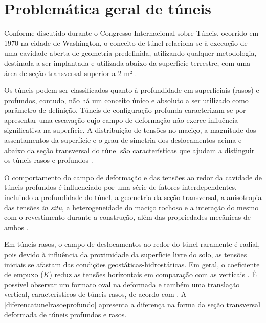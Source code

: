 %
%
%
%
\chapter{Problemática geral de túneis}\label{aspectosgeraistuneis}

Conforme discutido durante o Congresso Internacional sobre Túneis, ocorrido em 1970 na cidade de Washington, o conceito de túnel relaciona-se à execução de uma cavidade aberta de geometria predefinida, utilizando qualquer metodologia, destinada a ser implantada e utilizada abaixo da superfície terrestre, com uma área de seção transversal superior a 2 m² \cite{Teixeira1994}.

Os túneis podem ser classificados quanto à profundidade em superficiais (rasos) e profundos, contudo, não há um conceito único e absoluto a ser utilizado como parâmetro de definição. Túneis de configuração profunda caracterizam-se por apresentar uma escavação cujo campo de deformação não exerce influência significativa na superfície. A distribuição de tensões no maciço, a magnitude dos assentamentos da superfície e o grau de simetria dos deslocamentos acima e abaixo da seção transversal do túnel são características que ajudam a distinguir os túneis rasos e profundos \cite{Jensenetal2019}.

O comportamento do campo de deformação e das tensões ao redor da cavidade de túneis profundos é influenciado por uma série de fatores interdependentes, incluindo a profundidade do túnel, a geometria da seção transversal, a anisotropia das tensões \textit{in situ}, a heterogeneidade do maciço rochoso e a interação do mesmo com o revestimento durante a construção, além das propriedades mecânicas de ambos \cite{Quevedoetal2022}.

Em túneis rasos, o campo de deslocamentos ao redor do túnel raramente é radial, pois devido à influência da proximidade da superfície livre do solo, as tensões iniciais se afastam das condições geostáticas-hidrostáticas. Em geral, o coeficiente de empuxo ($K$) reduz as tensões horizontais em comparação com as verticais \cite{Jensen2019}. É possível observar um formato oval na deformada e também uma translação vertical, característicos de túneis rasos, de acordo com . A \autoref{diferencatunelrasoeprofundo} apresenta a diferença na forma da seção transversal deformada de túneis profundos e rasos.

